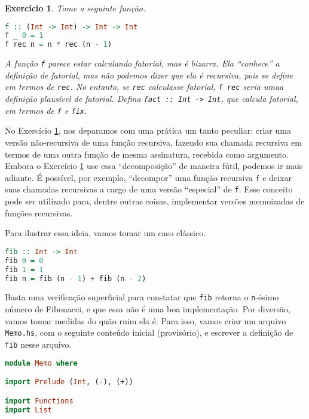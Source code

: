 \documentclass[a4paper]{article}
\newtheorem{exercicio}{Exercício}
\begin{document}
\begin{exercicio}	\label{exercicioFixFactorial}
	Tome a seguinte função.
\begin{lstlisting}[language=haskell, frame=single]
f :: (Int -> Int) -> Int -> Int
f _ 0 = 1
f rec n = n * rec (n - 1)
\end{lstlisting}
A função \emph{\texttt{f}} parece estar calculando fatorial, mas é bizarra.
Ela ``conhece'' a definição de fatorial, mas não podemos dizer que ela é recursiva, pois se define em termos de \emph{\texttt{rec}}.
No entanto, se \emph{\texttt{rec}} calculasse fatorial, \emph{\texttt{f rec}} seria umaa definição plausível de fatorial.
Defina \mbox{\emph{\texttt{fact :: Int -> Int}}}, que calcula fatorial, em termos de \emph{\texttt{f}} e \emph{\texttt{fix}}.
\end{exercicio}

No Exercício \ref{exercicioFixFactorial}, nos deparamos com uma prática um tanto peculiar: criar uma versão não-recursiva de uma função recursiva, fazendo sua chamada recursiva em termos de uma outra função de mesma assinatura, recebida como argumento.
Embora o Exercício \ref{exercicioFixFactorial} use essa ``decomposição'' de maneira fútil, podemos ir mais adiante.
É possível, por exemplo, ``decompor'' uma função recursiva \texttt{f} e deixar suas chamadas recursivas a cargo de uma versão ``especial'' de \texttt{f}.
Esse conceito pode ser utilizado para, dentre outras coisas, implementar versões memoizadas de funções recursivas.

Para ilustrar essa ideia, vamos tomar um caso clássico.

\begin{lstlisting}[language=haskell, frame=single]
fib :: Int -> Int
fib 0 = 0
fib 1 = 1
fib n = fib (n - 1) + fib (n - 2)
\end{lstlisting}

Basta uma verificação superficial para constatar que \texttt{fib} retorna o \texttt{n}-ésimo número de Fibonacci, e que essa não é uma boa implementação.
Por diversão, vamos tomar medidas do quão ruim ela é.
Para isso, vamos criar um arquivo \texttt{Memo.hs}, com o seguinte conteúdo inicial (provisório), e escrever a definição de \texttt{fib} nesse arquivo.

\begin{lstlisting}[language=haskell, frame=single]
module Memo where

import Prelude (Int, (-), (+))

import Functions
import List
\end{lstlisting}
\end{document}
